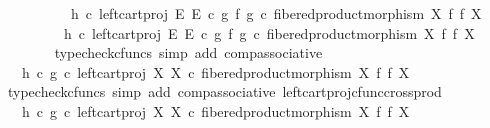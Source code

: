 \begin{isabellebody}
\ \ \isamarkupfalse%
\ {\isacharminus}{\kern0pt}\isanewline
\ \ \ \ \isamarkupfalse%
\ {\isachardoublequoteopen}{\isacharparenleft}{\kern0pt}h\ {\isasymcirc}\isactrlsub c\ left{\isacharunderscore}{\kern0pt}cart{\isacharunderscore}{\kern0pt}proj\ E\ E{\isacharparenright}{\kern0pt}\ {\isasymcirc}\isactrlsub c\ {\isacharparenleft}{\kern0pt}g\ {\isasymtimes}\isactrlsub f\ g{\isacharparenright}{\kern0pt}\ {\isasymcirc}\isactrlsub c\ fibered{\isacharunderscore}{\kern0pt}product{\isacharunderscore}{\kern0pt}morphism\ X\ f\ f\ X\isanewline
\ \ \ \ \ \ \ \ {\isacharequal}{\kern0pt}\ h\ {\isasymcirc}\isactrlsub c\ {\isacharparenleft}{\kern0pt}left{\isacharunderscore}{\kern0pt}cart{\isacharunderscore}{\kern0pt}proj\ E\ E\ {\isasymcirc}\isactrlsub c\ {\isacharparenleft}{\kern0pt}g\ {\isasymtimes}\isactrlsub f\ g{\isacharparenright}{\kern0pt}{\isacharparenright}{\kern0pt}\ {\isasymcirc}\isactrlsub c\ fibered{\isacharunderscore}{\kern0pt}product{\isacharunderscore}{\kern0pt}morphism\ X\ f\ f\ X{\isachardoublequoteclose}\isanewline
\ \ \ \ \ \ \isamarkupfalse%
\ {\isacharparenleft}{\kern0pt}typecheck{\isacharunderscore}{\kern0pt}cfuncs{\isacharcomma}{\kern0pt}\ simp\ add{\isacharcolon}{\kern0pt}\ comp{\isacharunderscore}{\kern0pt}associative{}{\isacharparenright}{\kern0pt}\isanewline
\ \ \ \ \isamarkupfalse%
\ \isamarkupfalse%
\ {\isachardoublequoteopen}{\isachardot}{\kern0pt}{\isachardot}{\kern0pt}{\isachardot}{\kern0pt}\ {\isacharequal}{\kern0pt}\ h\ {\isasymcirc}\isactrlsub c\ {\isacharparenleft}{\kern0pt}g\ {\isasymcirc}\isactrlsub c\ left{\isacharunderscore}{\kern0pt}cart{\isacharunderscore}{\kern0pt}proj\ X\ X{\isacharparenright}{\kern0pt}\ {\isasymcirc}\isactrlsub c\ fibered{\isacharunderscore}{\kern0pt}product{\isacharunderscore}{\kern0pt}morphism\ X\ f\ f\ X{\isachardoublequoteclose}\isanewline
\ \ \ \ \ \ \isamarkupfalse%
\ {\isacharparenleft}{\kern0pt}typecheck{\isacharunderscore}{\kern0pt}cfuncs{\isacharcomma}{\kern0pt}\ simp\ add{\isacharcolon}{\kern0pt}\ comp{\isacharunderscore}{\kern0pt}associative{}\ left{\isacharunderscore}{\kern0pt}cart{\isacharunderscore}{\kern0pt}proj{\isacharunderscore}{\kern0pt}cfunc{\isacharunderscore}{\kern0pt}cross{\isacharunderscore}{\kern0pt}prod{\isacharparenright}{\kern0pt}\isanewline
\ \ \ \ \isamarkupfalse%
\ \isamarkupfalse%
\ {\isachardoublequoteopen}{\isachardot}{\kern0pt}{\isachardot}{\kern0pt}{\isachardot}{\kern0pt}\ {\isacharequal}{\kern0pt}\ {\isacharparenleft}{\kern0pt}h\ {\isasymcirc}\isactrlsub c\ g{\isacharparenright}{\kern0pt}\ {\isasymcirc}\isactrlsub c\ left{\isacharunderscore}{\kern0pt}cart{\isacharunderscore}{\kern0pt}proj\ X\ X\ {\isasymcirc}\isactrlsub c\ fibered{\isacharunderscore}{\kern0pt}product{\isacharunderscore}{\kern0pt}morphism\ X\ f\ f\ X{\isachardoublequoteclose}\isanewline

\end{isabellebody}
